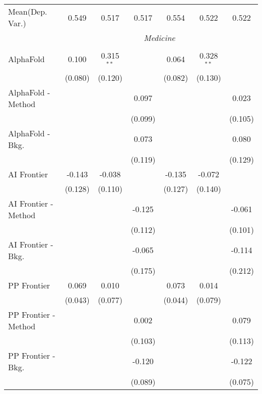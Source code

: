 \begin{tabular}{lcccccc}
Mean(Dep. Var.) & 0.549 & 0.517 & 0.517 & 0.554 & 0.522 & 0.522 \\
 & \multicolumn{6}{c}{\textit{Medicine}} \\ \\
   AlphaFold            & 0.100   & 0.315$^{**}$ &         & 0.064   & 0.328$^{**}$ &   \\   
                        & (0.080) & (0.120)      &         & (0.082) & (0.130)      &   \\   
   AlphaFold - Method   &         &              & 0.097   &         &              & 0.023\\   
                        &         &              & (0.099) &         &              & (0.105)\\   
   AlphaFold - Bkg.     &         &              & 0.073   &         &              & 0.080\\   
                        &         &              & (0.119) &         &              & (0.129)\\   
   AI Frontier          & -0.143  & -0.038       &         & -0.135  & -0.072       &   \\   
                        & (0.128) & (0.110)      &         & (0.127) & (0.140)      &   \\   
   AI Frontier - Method &         &              & -0.125  &         &              & -0.061\\   
                        &         &              & (0.112) &         &              & (0.101)\\   
   AI Frontier - Bkg.   &         &              & -0.065  &         &              & -0.114\\   
                        &         &              & (0.175) &         &              & (0.212)\\   
   PP Frontier          & 0.069   & 0.010        &         & 0.073   & 0.014        &   \\   
                        & (0.043) & (0.077)      &         & (0.044) & (0.079)      &   \\   
   PP Frontier - Method &         &              & 0.002   &         &              & 0.079\\   
                        &         &              & (0.103) &         &              & (0.113)\\   
   PP Frontier - Bkg.   &         &              & -0.120  &         &              & -0.122\\   
                        &         &              & (0.089) &         &              & (0.075)\\   

\end{tabular}
